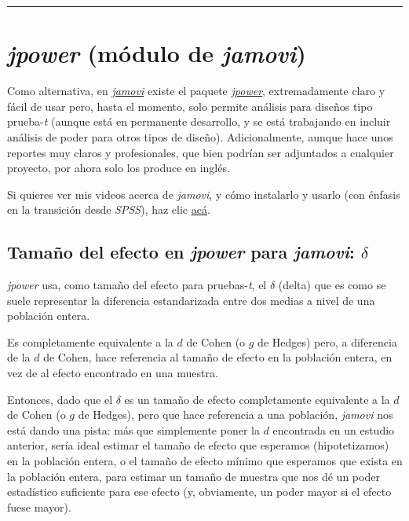 \documentclass[
]{article}
\begin{document}
\begin{center}\rule{0.5\linewidth}{0.5pt}\end{center}

\hypertarget{jpower-muxf3dulo-de-jamovi}{%
\section{\texorpdfstring{\emph{jpower} (módulo de
\emph{jamovi})}{jpower (módulo de jamovi)}}\label{jpower-muxf3dulo-de-jamovi}}

Como alternativa, en \href{https://www.jamovi.org/}{\emph{jamovi}}
existe el paquete
\href{https://github.com/richarddmorey/jpower}{\emph{jpower}},
extremadamente claro y fácil de usar pero, hasta el momento, solo
permite análisis para diseños tipo prueba-\emph{t} (aunque está en
permanente desarrollo, y se está trabajando en incluir análisis de poder
para otros tipos de diseño). Adicionalmente, aunque hace unos reportes
muy claros y profesionales, que bien podrían ser adjuntados a cualquier
proyecto, por ahora solo los produce en inglés.

Si quieres ver mis videos acerca de \emph{jamovi}, y cómo instalarlo y
usarlo (con énfasis en la transición desde \emph{SPSS}), haz clic
\href{https://www.youtube.com/playlist?list=PLHk7UNt35ccXX4I61PiVMOf9VkijgaJN8}{acá}.

\hypertarget{tamauxf1o-del-efecto-en-jpower-para-jamovi-delta}{%
\subsection{\texorpdfstring{Tamaño del efecto en \emph{jpower} para
\emph{jamovi}:
\(\delta\)}{Tamaño del efecto en jpower para jamovi: \textbackslash delta}}\label{tamauxf1o-del-efecto-en-jpower-para-jamovi-delta}}

\emph{jpower} usa, como tamaño del efecto para pruebas-\emph{t}, el
\(\delta\) (delta) que es como se suele representar la diferencia
estandarizada entre dos medias a nivel de una población entera.

Es completamente equivalente a la \(d\) de Cohen (o \(g\) de Hedges)
pero, a diferencia de la \(d\) de Cohen, hace referencia al tamaño de
efecto en la población entera, en vez de al efecto encontrado en una
muestra.

Entonces, dado que el \(\delta\) es un tamaño de efecto completamente
equivalente a la \(d\) de Cohen (o \(g\) de Hedges), pero que hace
referencia a una población, \emph{jamovi} nos está dando una pista: más
que simplemente poner la \(d\) encontrada en un estudio anterior, sería
ideal estimar el tamaño de efecto que esperamos (hipotetizamos) en la
población entera, o el tamaño de efecto mínimo que esperamos que exista
en la población entera, para estimar un tamaño de muestra que nos dé un
poder estadístico suficiente para ese efecto (y, obviamente, un poder
mayor si el efecto fuese mayor).
\end{document}

